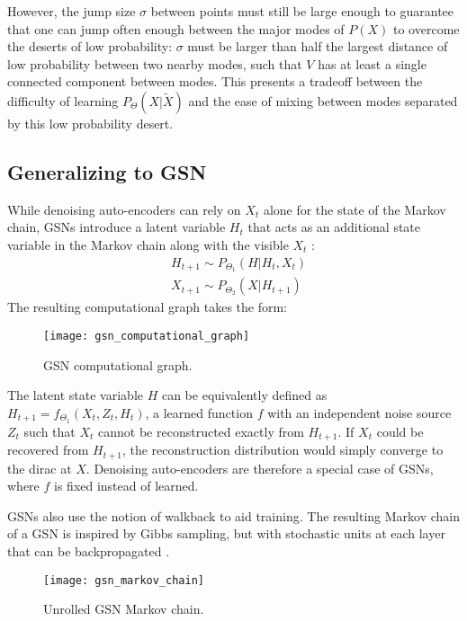 However, the jump size \(\sigma\) between points must still be large enough to guarantee that one can jump often enough between the major modes of \(P(X)\) to overcome the deserts of low probability: \(\sigma\) must be larger than half the largest distance of low probability between two nearby modes, such that \(V\) has at least a single connected component between modes. This presents a tradeoff between the difficulty of learning \(P_{\Theta}(X|\widetilde{X})\) and the ease of mixing between modes separated by this low probability desert.


\subsection{Generalizing to GSN}

While denoising auto-encoders can rely on \(X_t\) alone for the state of the Markov chain, GSNs introduce a latent variable \(H_t\) that acts as an additional state variable in the Markov chain along with the visible \(X_t\) \cite{gsn}:
\begin{align*}
 &H_{t+1} \sim P_{\Theta_1}(H|H_t, X_t)\\
 &X_{t+1} \sim  P_{\Theta_2}(X|H_{t+1})
\end{align*}
The resulting computational graph takes the form:

\begin{figure}[h!]
  \centering
    \texttt{[image: gsn\_computational\_graph]}
\caption{GSN computational graph.}
\end{figure}
The latent state variable \(H\) can be equivalently defined as \(H_{t+1} = f_{\Theta_1}(X_t,Z_t,H_t)\), a learned function \(f\) with an independent noise source \(Z_t\) such that \(X_t\) cannot be reconstructed exactly from \(H_{t+1}\). If \(X_t\) could be recovered from \(H_{t+1}\), the reconstruction distribution would simply converge to the dirac at \(X\). Denoising auto-encoders are therefore a special case of GSNs, where \(f\) is fixed instead of learned.

GSNs also use the notion of walkback to aid training. The resulting Markov chain of a GSN is inspired by Gibbs sampling, but with stochastic units at each layer that can be backpropagated \cite{rezende14}.

\begin{figure}[h!]
  \centering
    \texttt{[image: gsn\_markov\_chain]}
\caption{Unrolled GSN Markov chain.}
\end{figure}




